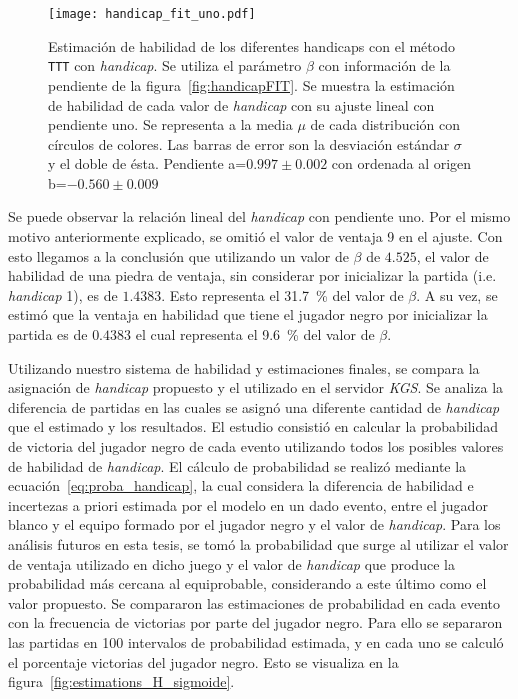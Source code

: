 \documentclass[11pt,twoside,spanish]{report} %
\begin{document}
\begin{figure}[H]
	\centering
    \texttt{[image: handicap\_fit\_uno.pdf]}
    \caption{Estimaci\'on de habilidad de los diferentes handicaps con el m\'etodo \texttt{TTT} con \textit{handicap}. Se utiliza el par\'ametro $\beta$ con informaci\'on de la pendiente de la figura~\ref{fig:handicapFIT}. Se muestra la estimaci\'on de habilidad de cada valor de \textit{handicap} con su ajuste lineal con pendiente uno. Se representa a la media $\mu$ de cada distribuci\'on con c\'irculos de colores.  Las barras de error son la desviaci\'on est\'andar $\sigma$ y el doble de \'esta.  Pendiente a=$0.997\pm0.002$ con ordenada al origen b=$-0.560\pm0.009$}
    \label{fig:handicap_fit_uno}
\end{figure}


Se puede observar la relaci\'on lineal del \textit{handicap} con pendiente uno.
Por el mismo motivo anteriormente explicado, se omiti\'o el valor de ventaja 9 en el ajuste.
Con esto llegamos a la conclusi\'on que utilizando un valor de $\beta$ de $4.525$, el valor de habilidad de una piedra de ventaja, sin considerar por inicializar la partida (i.e. \textit{handicap} 1), es de $1.4383$.
Esto representa el \SI{31.7}{\percent} del valor de $\beta$.
A su vez, se estim\'o que la ventaja en habilidad que tiene el jugador negro por inicializar la partida es de $0.4383$ el cual representa el \SI{9.6}{\percent} del valor de $\beta$.

Utilizando nuestro sistema de habilidad y estimaciones finales,  se compara la asignaci\'on de \textit{handicap} propuesto y el utilizado en el servidor \textit{KGS}.
Se analiza la diferencia de partidas en las cuales se asign\'o una diferente cantidad de \textit{handicap} que el estimado y los resultados.
El estudio consisti\'o en calcular la probabilidad de victoria del jugador negro de cada evento utilizando todos los posibles valores de habilidad de \textit{handicap}.
El c\'alculo de probabilidad se realiz\'o mediante la ecuaci\'on~\ref{eq:proba_handicap}, la cual considera la diferencia de habilidad e incertezas a priori estimada por el modelo en un dado evento, entre el jugador blanco y el equipo formado por el jugador negro y el valor de \textit{handicap}.
Para los an\'alisis futuros en esta tesis, se tom\'o la probabilidad que surge al utilizar el valor de ventaja utilizado en dicho juego y el valor de \textit{handicap} que produce la probabilidad m\'as cercana al equiprobable, considerando a este \'ultimo como el valor propuesto.
Se compararon las estimaciones de probabilidad en cada evento con la frecuencia de victorias por parte del jugador negro.
Para ello se separaron las partidas en 100 intervalos de probabilidad estimada, y en cada uno se calcul\'o el porcentaje victorias del jugador negro.
Esto se visualiza en la figura~\ref{fig:estimations_H_sigmoide}.
\end{document}

